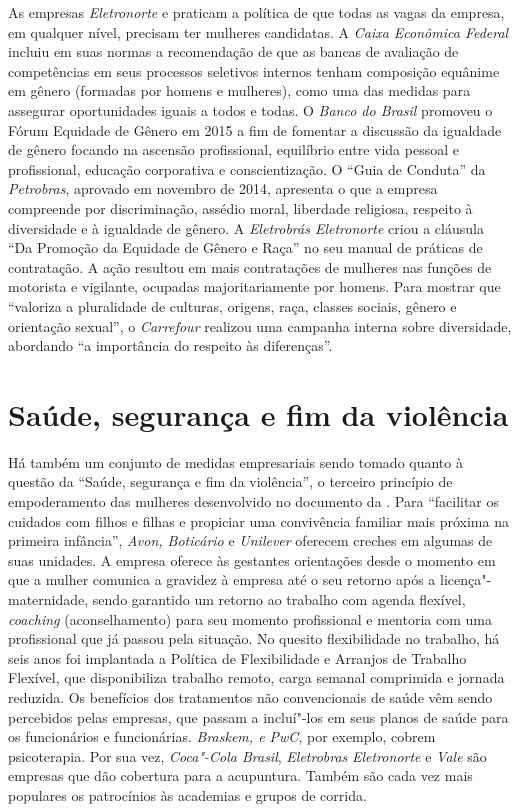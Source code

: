 As empresas \emph{Eletronorte} e \emph{} praticam a política de que
todas as vagas da empresa, em qualquer nível, precisam ter mulheres
candidatas. A \emph{Caixa Econômica Federal} incluiu em suas normas a
recomendação de que as bancas de avaliação de competências em seus
processos seletivos internos tenham composição equânime em gênero
(formadas por homens e mulheres), como uma das medidas para assegurar
oportunidades iguais a todos e todas. O \emph{Banco do Brasil} promoveu
o Fórum Equidade de Gênero em 2015 a fim de fomentar a discussão da
igualdade de gênero focando na ascensão profissional, equilíbrio entre
vida pessoal e profissional, educação corporativa e conscientização. O
``Guia de Conduta'' da \emph{Petrobras}, aprovado em novembro de 2014,
apresenta o que a empresa compreende por discriminação, assédio moral,
liberdade religiosa, respeito à diversidade e à igualdade de gênero. A
\emph{Eletrobrás Eletronorte} criou a cláusula ``Da Promoção da Equidade
de Gênero e Raça'' no seu manual de práticas de contratação. A ação
resultou em mais contratações de mulheres nas funções de motorista e
vigilante, ocupadas majoritariamente por homens. Para mostrar que
``valoriza a pluralidade de culturas, origens, raça, classes sociais,
gênero e orientação sexual'', o \emph{Carrefour} realizou uma campanha
interna sobre diversidade, abordando ``a importância do respeito às
diferenças''.

\section{Saúde, segurança e fim da violência}

Há também um conjunto de medidas empresariais sendo tomado quanto à
questão da ``Saúde, segurança e fim da violência'', o terceiro princípio
de empoderamento das mulheres desenvolvido no documento da . Para
``facilitar os cuidados com filhos e filhas e propiciar uma convivência
familiar mais próxima na primeira infância'', \emph{Avon, Boticário} e
\emph{Unilever} oferecem creches em algumas de suas unidades. A empresa
 oferece às gestantes orientações desde o momento em que a mulher
comunica a gravidez à empresa até o seu retorno após a
licença"-maternidade, sendo garantido um retorno ao trabalho com agenda
flexível, \emph{coaching} (aconselhamento) para seu momento profissional
e mentoria com uma profissional que já passou pela situação. No quesito
flexibilidade no trabalho, há seis anos foi implantada a Política de
Flexibilidade e Arranjos de Trabalho Flexível, que disponibiliza
trabalho remoto, carga semanal comprimida e jornada reduzida. Os
benefícios dos tratamentos não convencionais de saúde vêm sendo
percebidos pelas empresas, que passam a incluí"-los em seus planos de
saúde para os funcionários e funcionárias. \emph{Braskem,  e PwC},
por exemplo, cobrem psicoterapia. Por sua vez, \emph{Coca"-Cola Brasil},
\emph{Eletrobras} \emph{Eletronorte} e \emph{Vale} são empresas que dão
cobertura para a acupuntura. Também são cada vez mais populares os
patrocínios às academias e grupos de corrida.

